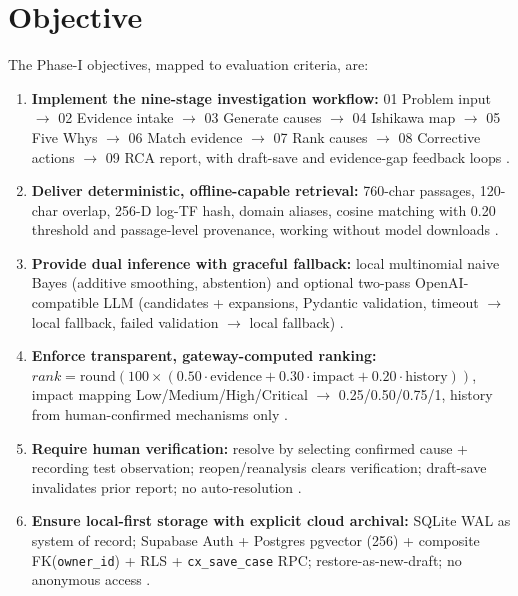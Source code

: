 \documentclass[12pt,a4paper,oneside]{report}
\begin{document}
\section{Objective}
\label{sec:objective}

The Phase-I objectives, mapped to evaluation criteria, are:

\begin{enumerate}[label=O\arabic*.,leftmargin=1.8em]
\item \textbf{Implement the nine-stage investigation workflow:} 01 Problem input $\rightarrow$ 02 Evidence intake $\rightarrow$ 03 Generate causes $\rightarrow$ 04 Ishikawa map $\rightarrow$ 05 Five Whys $\rightarrow$ 06 Match evidence $\rightarrow$ 07 Rank causes $\rightarrow$ 08 Corrective actions $\rightarrow$ 09 RCA report, with draft-save and evidence-gap feedback loops \cite{remil2024aiops}.

\item \textbf{Deliver deterministic, offline-capable retrieval:} 760-char passages, 120-char overlap, 256-D log-TF hash, domain aliases, cosine matching with 0.20 threshold and passage-level provenance, working without model downloads \cite{robertson2009probabilistic,reimers2019sentencebert,izacard2021leveraging}.

\item \textbf{Provide dual inference with graceful fallback:} local multinomial naive Bayes (additive smoothing, abstention) and optional two-pass OpenAI-compatible LLM (candidates + expansions, Pydantic validation, timeout $\rightarrow$ local fallback, failed validation $\rightarrow$ local fallback) \cite{chen2024rcacopilot,goel2024xlifecycle,jiang2024xpert,lascasas2024llexus}.

\item \textbf{Enforce transparent, gateway-computed ranking:} $rank = \text{round}(100\times(0.50\cdot\text{evidence}+0.30\cdot\text{impact}+0.20\cdot\text{history}))$, impact mapping Low/Medium/High/Critical $\rightarrow$ 0.25/0.50/0.75/1, history from human-confirmed mechanisms only \cite{chen2020microscope,zhu2024hemirca}.

\item \textbf{Require human verification:} resolve by selecting confirmed cause + recording test observation; reopen/reanalysis clears verification; draft-save invalidates prior report; no auto-resolution \cite{card2017problem,doggett2005root}.

\item \textbf{Ensure local-first storage with explicit cloud archival:} SQLite WAL as system of record; Supabase Auth + Postgres pgvector (256) + composite FK(\texttt{owner\_id}) + RLS + \texttt{cx\_save\_case} RPC; restore-as-new-draft; no anonymous access \cite{ma2020automating}.


\end{enumerate}
\end{document}
